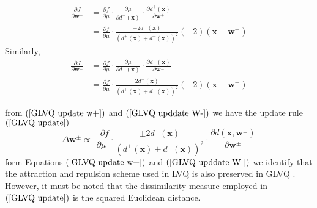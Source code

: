 \begin{equation}\label{GLVQ update w+}
	\begin{split}
		\frac{\partial J}{\partial \mathbf{w}^+}&=\frac{\partial f}{\partial \mu}\cdot\frac{\partial \mu}{\partial d^{+}\left( \mathbf{x}\right)}\cdot\frac{\partial d^{+}\left( \mathbf{x}\right) }{\partial \mathbf{w}^{+}}\\ 
		&= \frac{\partial f}{\partial \mu}\cdot\frac{-2d^{-}\left( \mathbf{x}\right) }{\left( d^{+}\left( \mathbf{x}\right) + d^{-}\left( \mathbf{x}\right) \right) ^2} \left( -2\right) \left( \mathbf{x}-\mathbf{w}^{+}\right) 	
	\end{split} 
\end{equation}
Similarly,
\begin{equation}\label{GLVQ upddate W-}
	\begin{split}
		\frac{\partial J}{\partial \mathbf{w}^-}&=\frac{\partial f}{\partial \mu}\cdot\frac{\partial \mu}{\partial d^{-}\left( \mathbf{x}\right)}\cdot\frac{\partial d^{-}\left( \mathbf{x}\right) }{\partial \mathbf{w}^{-}}\\
		&= \frac{\partial f}{\partial \mu}\cdot\frac{2d^{+}\left( \mathbf{x}\right) }{\left( d^{+}\left( \mathbf{x}\right) + d^{-}\left( \mathbf{x}\right) \right) ^2} \left( -2\right) \left( \mathbf{x}-\mathbf{w}^{-}\right)
	\end{split}
\end{equation}

from $\left( \ref{GLVQ update w+}\right)$  and $\left( \ref{GLVQ upddate W-}\right)$  we have the update rule $\left( \ref{GLVQ update}\right) $
\begin{equation}\label{GLVQ update}
	\Delta \mathbf{w}^{\pm}\propto\frac{-\partial f}{\partial \mu}\cdot\frac{\pm 2d^{\mp}\left( \mathbf{x}\right) }{\left( d^{+}\left( \mathbf{x}\right) +d^{-}\left( \mathbf{x}\right) \right)^2 }\cdot\frac{\partial d\left( \mathbf{x},\mathbf{w}^{\pm }\right) }{\partial \mathbf{w}^{\pm}}
\end{equation}
form Equations $\left( \ref{GLVQ update w+}\right)$  and $\left( \ref{GLVQ upddate W-}\right)$  we identify that the attraction and repulsion scheme used in LVQ  is also preserved  in GLVQ\cite{villmann2017can} .
However, it must be noted that the dissimilarity measure employed in $\left( \ref{GLVQ update}\right)$  is the squared Euclidean distance\cite{sato1996generalized}.
